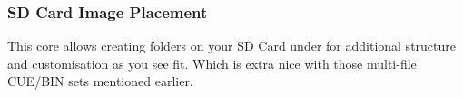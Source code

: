 \documentclass[english]{retronlabo-manual}
\begin{document}
\subsubsection{SD Card Image Placement}

This core allows creating folders on your SD Card under  for additional structure and customisation as you see fit. Which is extra nice with those multi-file CUE/BIN sets mentioned earlier.


\BackMatter
\end{document}
